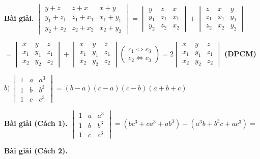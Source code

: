 \documentclass[12pt]{report}
\begin{document}
\textbf{Bài giải. }
$\begin{vmatrix}
	y+z & z+x & x+y \\
	y_1+z_1 & z_1+x_1 & x_1+y_1 \\
	y_2+z_2 & z_2+x_2 & x_2+y_2
\end{vmatrix} = \begin{vmatrix}
	y & z & x \\
	y_1 & z_1 & x_1 \\
	y_2 & z_2 & x_2
\end{vmatrix} + \begin{vmatrix}
	z & x & y \\
	z_1 & x_1 & y_1 \\
	z_2 & x_2 & y_2
\end{vmatrix}$

$= \begin{vmatrix}
	x & y & z \\
	x_1 & y_1 & z_1 \\
	x_2 & y_2 & z_2
\end{vmatrix} + \begin{vmatrix}
	x & y & z \\
	x_1 & y_1 & z_1 \\
	x_2 & y_2 & z_2
\end{vmatrix} \left( \begin{smallmatrix}
	c_1 \iff c_3 \\ c_2 \iff c_3
\end{smallmatrix} \right) = 2 \begin{vmatrix}
	x & y & z \\
	x_1 & y_1 & z_1 \\
	x_2 & y_2 & z_2
\end{vmatrix}$ \textbf{(ĐPCM)}

$b)\ \begin{vmatrix}
	1 & a & a^3 \\
	1 & b & b^3 \\
	1 & c & c^3
\end{vmatrix}
= (b-a)(c-a)(c-b)(a+b+c)$

\textbf{Bài giải (Cách 1). }$\begin{vmatrix}
	1 & a & a^3 \\
	1 & b & b^3 \\
	1 & c & c^3
\end{vmatrix} = (bc^3+ca^3+ab^3) - (a^3b+b^3c+ac^3) = $

\textbf{Bài giải (Cách 2). }
\end{document}
